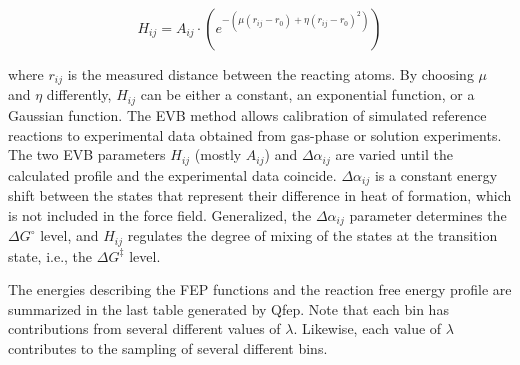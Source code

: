 \documentclass{article}
\begin{document}
\begin{equation}
    H_{ij} = A_{ij} \cdot (e^{-(\mu (r_{ij} - r_0) + \eta (r_{ij} - r_0)^2)})
\end{equation}

where \(r_{ij}\) is the measured distance between the reacting atoms. By choosing \(\mu\) and \(\eta\) differently, \(H_{ij}\) can be either a constant, an exponential function, or a Gaussian function. The EVB method allows calibration of simulated reference reactions to experimental data obtained from gas-phase or solution experiments. The two EVB parameters \(H_{ij}\) (mostly \(A_{ij}\)) and \(\Delta \alpha_{ij}\) are varied until the calculated profile and the experimental data coincide. \(\Delta \alpha_{ij}\) is a constant energy shift between the states that represent their difference in heat of formation, which is not included in the force field. Generalized, the \(\Delta \alpha_{ij}\) parameter determines the \(\Delta G^\circ\) level, and \(H_{ij}\) regulates the degree of mixing of the states at the transition state, i.e., the \(\Delta G^\ddagger\) level.

The energies describing the FEP functions and the reaction free energy profile are summarized in the last table generated by Qfep. Note that each bin has contributions from several different values of \(\lambda\). Likewise, each value of \(\lambda\) contributes to the sampling of several different bins.
\end{document}
